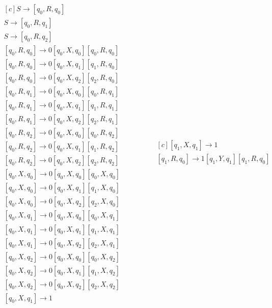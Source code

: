\documentclass[11pt,a4paper]{article}
\begin{document}
		\begin{equation*}
			\begin{aligned}[c]
			S \rightarrow [q_0, R, q_0] \qquad \qquad \qquad \qquad \\
			S \rightarrow [q_0, R, q_1] \qquad \qquad \qquad \qquad \\
			S \rightarrow [q_0, R, q_2] \qquad \qquad \qquad \qquad \\
			[q_0, R, q_0] \rightarrow 0[q_0, X, q_0][q_0, R, q_0] \\
			[q_0, R, q_0] \rightarrow 0[q_0, X, q_1][q_1, R, q_0] \\
			[q_0, R, q_0] \rightarrow 0[q_0, X, q_2][q_2, R, q_0] \\
			[q_0, R, q_1] \rightarrow 0[q_0, X, q_0][q_0, R, q_1] \\
			[q_0, R, q_1] \rightarrow 0[q_0, X, q_1][q_1, R, q_1] \\
			[q_0, R, q_1] \rightarrow 0[q_0, X, q_2][q_2, R, q_1] \\
			[q_0, R, q_2] \rightarrow 0[q_0, X, q_0][q_0, R, q_2] \\
			[q_0, R, q_2] \rightarrow 0[q_0, X, q_1][q_1, R, q_2] \\
			[q_0, R, q_2] \rightarrow 0[q_0, X, q_2][q_2, R, q_2] \\
			[q_0, X, q_0] \rightarrow 0[q_0, X, q_0][q_0, X, q_0] \\
			[q_0, X, q_0] \rightarrow 0[q_0, X, q_1][q_1, X, q_0] \\
			[q_0, X, q_0] \rightarrow 0[q_0, X, q_2][q_2, X, q_0] \\
			[q_0, X, q_1] \rightarrow 0[q_0, X, q_0][q_0, X, q_1] \\
			[q_0, X, q_1] \rightarrow 0[q_0, X, q_1][q_1, X, q_1] \\
			[q_0, X, q_1] \rightarrow 0[q_0, X, q_2][q_2, X, q_1] \\
			[q_0, X, q_2] \rightarrow 0[q_0, X, q_0][q_0, X, q_2] \\
			[q_0, X, q_2] \rightarrow 0[q_0, X, q_1][q_1, X, q_2] \\
			[q_0, X, q_2] \rightarrow 0[q_0, X, q_2][q_2, X, q_2] \\
			[q_0, X, q_1] \rightarrow 1 \qquad \qquad \qquad \qquad
			\end{aligned}
			\qquad \qquad
			\begin{aligned}[c]
			[q_1, X, q_1] \rightarrow 1 \qquad \qquad \qquad \qquad \\
			[q_1, R, q_0] \rightarrow 1[q_1, Y, q_1][q_1, R, q_0] \\

\end{aligned}
\end{equation*}
\end{document}
